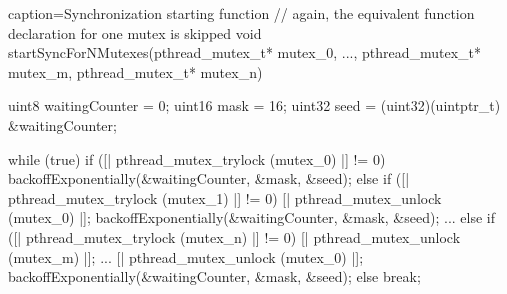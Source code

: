 \begin{ccode}{caption=Synchronization starting function}
// again, the equivalent function declaration for one mutex is skipped
void startSyncForNMutexes(pthread_mutex_t* mutex_0, ..., pthread_mutex_t* mutex_m, pthread_mutex_t* mutex_n) { 
  uint8 waitingCounter = 0; 
  uint16 mask = 16; 
  uint32 seed = (uint32)(uintptr_t) &waitingCounter;
  
  while (true) { 
    if ([| pthread_mutex_trylock (mutex_0) |] != 0) { 
      backoffExponentially(&waitingCounter, &mask, &seed); 
    } 
    else if ([| pthread_mutex_trylock (mutex_1) |] != 0) { 
      [| pthread_mutex_unlock (mutex_0) |]; 
      backoffExponentially(&waitingCounter, &mask, &seed); 
    } ...
    else if ([| pthread_mutex_trylock (mutex_n) |] != 0) { 
      [| pthread_mutex_unlock (mutex_m) |];
      ...
      [| pthread_mutex_unlock (mutex_0) |]; 
      backoffExponentially(&waitingCounter, &mask, &seed); 
    } 
    else { 
      break; 
    } 
  }
}
\end{ccode}

